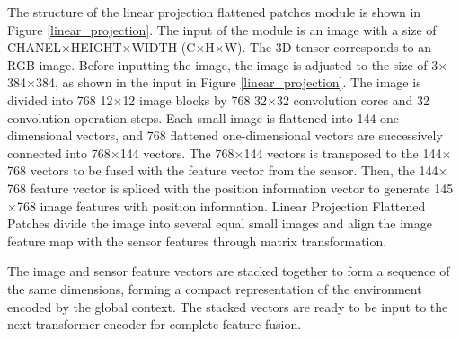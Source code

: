 \documentclass[acmsmall,manuscript, screen, review]{acmart}
\begin{document}
The structure of the linear projection flattened patches module is shown in Figure \ref{linear_projection}. The input of the module is an image with a size of  CHANEL\begin{math}\times\end{math}HEIGHT\begin{math}\times\end{math}WIDTH (C\begin{math}\times\end{math}H\begin{math}\times\end{math}W). The 3D tensor corresponds to an RGB image. Before inputting the image, the image is adjusted to the size of 3\begin{math}\times\end{math}384\begin{math}\times\end{math}384, as shown in the input in Figure \ref{linear_projection}. The image is divided into 768 12\begin{math}\times\end{math}12 image blocks by 768 32\begin{math}\times\end{math}32 convolution cores and 32 convolution operation steps. Each small image is flattened into 144 one-dimensional vectors, and 768 flattened one-dimensional vectors are successively connected into 768\begin{math}\times\end{math}144 vectors. The 768\begin{math}\times\end{math}144 vectors is transposed to the 144\begin{math}\times\end{math}768 vectors to be fused with the feature vector from the sensor. Then, the 144\begin{math}\times\end{math}768 feature vector is spliced with the position information vector to generate 145\begin{math}\times\end{math}768 image features with position information. Linear Projection Flattened Patches divide the image into several equal small images and align the image feature map with the sensor features through matrix transformation. 

The image and sensor feature vectors are stacked together to form a sequence of the same dimensions, forming a compact representation of the environment encoded by the global context. The stacked vectors are ready to be input to the next transformer encoder for complete feature fusion. 
\end{document}
